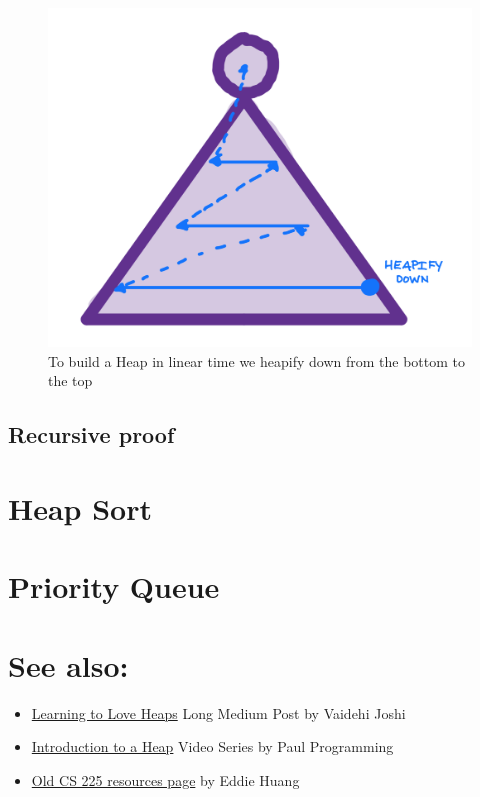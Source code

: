 \documentclass[
]{book}
\begin{document}
\begin{figure}
\centering
\includegraphics{images/heaps/build_heap.png}
\caption{To build a Heap in linear time we heapify down from the bottom to the top}
\end{figure}

\hypertarget{recursive-proof}{%
\subsection{Recursive proof}\label{recursive-proof}}

\hypertarget{heap-sort}{%
\section{Heap Sort}\label{heap-sort}}

\hypertarget{priority-queue}{%
\section{Priority Queue}\label{priority-queue}}

\hypertarget{see-also}{%
\section{See also:}\label{see-also}}

\begin{itemize}
\item
  \href{https://medium.com/basecs/learning-to-love-heaps-cef2b273a238}{Learning to Love Heaps} Long Medium Post by Vaidehi Joshi
\item
  \href{https://www.youtube.com/watch?v=c1TpLRyQJ4w}{Introduction to a Heap} Video Series by Paul Programming
\item
  \href{https://courses.engr.illinois.edu/cs225/sp2021/resources/heaps/}{Old CS 225 resources page} by Eddie Huang
\end{itemize}
\end{document}
